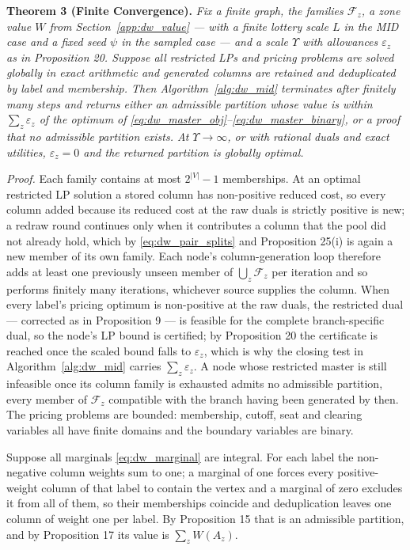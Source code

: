 \documentclass{article}
\begin{document}
\noindent\textbf{Theorem 3 (Finite Convergence).} \textit{Fix a finite graph,
the families $\mathcal F_z$, a zone value $W$ from
Section~\ref{app:dw_value} --- with a finite lottery scale $L$ in the MID case
and a fixed seed $\psi$ in the sampled case --- and a scale $\Upsilon$ with
allowances $\varepsilon_z$ as in Proposition 20. Suppose all restricted LPs and
pricing problems are solved globally in exact arithmetic and generated columns
are retained and deduplicated by label and membership. Then
Algorithm~\ref{alg:dw_mid} terminates after finitely many steps and returns
either an admissible partition whose value is within $\sum_z \varepsilon_z$ of
the optimum of \eqref{eq:dw_master_obj}--\eqref{eq:dw_master_binary}, or a proof
that no admissible partition exists. At $\Upsilon \to \infty$, or with rational
duals and exact utilities, $\varepsilon_z = 0$ and the returned partition is
globally optimal.}

\textit{Proof.} Each family contains at most $2^{|V|}-1$ memberships. At an
optimal restricted LP solution a stored column has non-positive reduced cost, so
every column added because its reduced cost at the raw duals is strictly
positive is new; a redraw round continues only when it contributes a column that
the pool did not already hold, which by \eqref{eq:dw_pair_splits} and
Proposition 25(i) is again a new member of its own family. Each node's
column-generation loop therefore adds at least one previously unseen member of
$\bigcup_z \mathcal F_z$ per iteration and so performs finitely many
iterations, whichever source supplies the column. When every label's pricing optimum is non-positive at the raw duals,
the restricted dual --- corrected as in Proposition 9 --- is feasible for the
complete branch-specific dual, so the node's LP bound is certified; by
Proposition 20 the certificate is reached once the scaled bound falls to
$\varepsilon_z$, which is why the closing test in
Algorithm~\ref{alg:dw_mid} carries $\sum_z \varepsilon_z$. A node whose
restricted master is still infeasible once its column family is exhausted
admits no admissible partition, every member of $\mathcal F_z$ compatible with
the branch having been generated by then. The pricing problems are bounded:
membership, cutoff, seat and clearing variables all have finite domains and the
boundary variables are binary.

Suppose all marginals \eqref{eq:dw_marginal} are integral. For each label the
non-negative column weights sum to one; a marginal of one forces every
positive-weight column of that label to contain the vertex and a marginal of
zero excludes it from all of them, so their memberships coincide and
deduplication leaves one column of weight one per label. By Proposition 15 that
is an admissible partition, and by Proposition 17 its value is
$\sum_z W(A_z)$.
\end{document}
